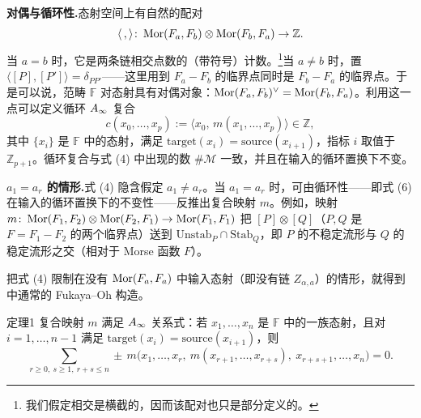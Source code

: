 \textbf{对偶与循环性.}\quad 态射空间上有自然的配对
\begin{equation*}
  \langle\,,\rangle\colon\operatorname{Mor}(F_a,F_b)\otimes\operatorname{Mor}(F_b,F_a)\to\mathbb Z.
\end{equation*}
当 $a=b$ 时，它是两条链相交点数的（带符号）计数。\footnote{我们假定相交是横截的，因而该配对也只是部分定义的。}当 $a\neq b$ 时，置 $\langle[P],[P']\rangle=\delta_{PP'}$——这里用到 $F_a-F_b$ 的临界点同时是 $F_b-F_a$ 的临界点。于是可以说，范畴 $\mathbb{F}$ 对态射具有对偶对象：$\operatorname{Mor}(F_a,F_b)^{\vee}=\operatorname{Mor}(F_b,F_a)$。利用这一点可以定义循环 $A_\infty$ 复合
\begin{equation}\tag{6}\label{eq:6}
  c(x_0,\dots,x_p):=\langle x_0,\,m(x_1,\dots,x_p)\rangle\in\mathbb Z,
\end{equation}
其中 $\{x_i\}$ 是 $\mathbb{F}$ 中的态射，满足 $\mathrm{target}(x_i)=\mathrm{source}(x_{i+1})$，指标 $i$ 取值于 $\mathbb Z_{p+1}$。循环复合与式 (4) 中出现的数 $\#\mathcal M$ 一致，并且在输入的循环置换下不变。

\textbf{$a_1=a_r$ 的情形.}\quad 式 (4) 隐含假定 $a_1\neq a_r$。当 $a_1=a_r$ 时，可由循环性——即式 (6) 在输入的循环置换下的不变性——反推出复合映射 $m$。例如，映射 $m\colon\operatorname{Mor}(F_1,F_2)\otimes\operatorname{Mor}(F_2,F_1)\to\operatorname{Mor}(F_1,F_1)$ 把 $[P]\otimes[Q]$（$P,Q$ 是 $F=F_1-F_2$ 的两个临界点）送到 $\mathrm{Unstab}_P\cap\mathrm{Stab}_Q$，即 $P$ 的不稳定流形与 $Q$ 的稳定流形之交（相对于 Morse 函数 $F$）。


把式 (4) 限制在没有 $\operatorname{Mor}(F_a,F_a)$ 中输入态射（即没有链 $Z_{\alpha,a}$）的情形，就得到 \cite{fukaya,fukayaoh} 中通常的 Fukaya--Oh 构造。

\begin{thmenv}{定理}{1}\label{thm:1}
复合映射 $m$ 满足 $A_\infty$ 关系式：若 $x_1,\dots,x_n$ 是 $\mathbb{F}$ 中的一族态射，且对 $i=1,\dots,n-1$ 满足 $\mathrm{target}(x_i)=\mathrm{source}(x_{i+1})$，则
\begin{equation}\tag{7}\label{eq:7}
  \sum_{r\ge 0,\ s\ge 1,\ r+s\le n}
  \pm\,m\bigl(x_1,\dots,x_r,\ m(x_{r+1},\dots,x_{r+s}),\ x_{r+s+1},\dots,x_n\bigr)=0.
\end{equation}
\end{thmenv}


\endinput
